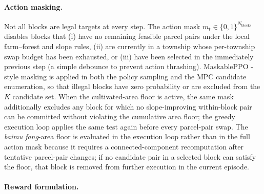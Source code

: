 \documentclass[11pt]{article}
\begin{document}
\paragraph{Action masking.}
Not all blocks are legal targets at every step. The action mask $m_t \in \{0, 1\}^{N_{\text{blocks}}}$ disables blocks that (i) have no remaining feasible parcel pairs under the local farm--forest and slope rules, (ii) are currently in a township whose per-township swap budget has been exhausted, or (iii) have been selected in the immediately previous step (a simple debounce to prevent action thrashing). MaskablePPO \citep{ross2011reduction,schulman2017proximal,huang2022maskable}-style masking is applied in both the policy sampling and the MPC candidate enumeration, so that illegal blocks have zero probability or are excluded from the $K$ candidate set. When the cultivated-area floor is active, the same mask additionally excludes any block for which no slope-improving within-block pair can be committed without violating the cumulative area floor; the greedy execution loop applies the same test again before every parcel-pair swap. The \textit{baimu fang}-area floor is evaluated in the execution loop rather than in the full action mask because it requires a connected-component recomputation after tentative parcel-pair changes; if no candidate pair in a selected block can satisfy the floor, that block is removed from further execution in the current episode.

\paragraph{Reward formulation.}\label{sec:methods-reward}
\end{document}
